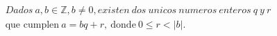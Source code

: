 \documentclass[preview]{standalone}
\begin{document}
\begin{align*}
Dados\ a, b \in \mathbb{Z}, b \neq 0, existen\ dos\ unicos\ numeros\ enteros\ q\ y\ r\\ \text{que\ cumplen} \ a = bq + r,\ \text{donde}\ 0 \leq r < |b|.
\end{align*}
\end{document}
